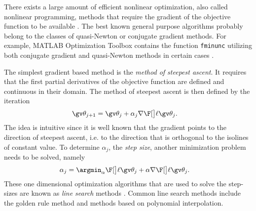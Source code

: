 
There exists a large amount of efficient nonlinear optimization,
also called nonlinear programming, methods that require the gradient of the 
objective function to be available \parencite{luenberger2008}.
The best known general purpose algorithms probably belong to the 
classes of quasi-Newton or conjugate gradient methods. 
For example, MATLAB Optimization Toolbox contains the function
\texttt{fminunc} utilizing both conjugate gradient and 
quasi-Newton methods in certain cases \parencite{optimizationtoolbox2012}.

The simplest gradient based method is the \emph{method of steepest ascent}.
It requires that the first partial derivatives of the objective function are defined
and continuous in their domain. The method of steepest ascent is then defined
by the iteration
\begin{align}
	\Th_{j+1}&=\Th_j+\alpha_j\nabla\lLH[\Th_j].
	\label{eq:steepest_descent}
\end{align}
The idea is intuitive since it is well known that the gradient
points to the direction of steepest ascent, i.e. to the direction
that is orthogonal to the isolines of constant value.
To determine $\alpha_j$, the \emph{step size}, another minimization problem needs to be solved,
namely
\begin{align}
	\alpha_j &= \argmin_\alpha \lLH[\Th_j+\alpha\nabla\lLH[\Th_j]].
	\label{eq:line_search}
\end{align}
These one dimensional optimization algorithms that are used
to solve the step-sizes are known as \emph{line search} methods \parencite{luenberger2008}.
Common line search methods include the golden rule method and 
methods based on polynomial interpolation.

